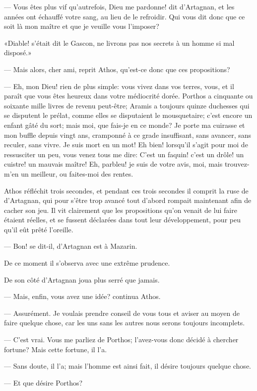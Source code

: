 — Vous êtes plus vif qu'autrefois, Dieu me pardonne! dit d'Artagnan, et les années ont échauffé votre sang, au lieu de le refroidir. Qui vous dit donc que ce soit là mon maître et que je veuille vous l'imposer?

«Diable! s'était dit le Gascon, ne livrons pas nos secrets à un homme si mal disposé.»

— Mais alors, cher ami, reprit Athos, qu'est-ce donc que ces propositions?

— Eh, mon Dieu! rien de plus simple: vous vivez dans vos terres, vous, et il paraît que vous êtes heureux dans votre médiocrité dorée. Porthos a cinquante ou soixante mille livres de revenu peut-être; Aramis a toujours quinze duchesses qui se disputent le prélat, comme elles se disputaient le mousquetaire; c'est encore un enfant gâté du sort; mais moi, que fais-je en ce monde? Je porte ma cuirasse et mon buffle depuis vingt ans, cramponné à ce grade insuffisant, sans avancer, sans reculer, sans vivre. Je suis mort en un mot! Eh bien! lorsqu'il s'agit pour moi de ressusciter un peu, vous venez tous me dire: C'est un faquin! c'est un drôle! un cuistre! un mauvais maître! Eh, parbleu! je suis de votre avis, moi, mais trouvez-m'en un meilleur, ou faites-moi des rentes.

Athos réfléchit trois secondes, et pendant ces trois secondes il comprit la ruse de d'Artagnan, qui pour s'être trop avancé tout d'abord rompait maintenant afin de cacher son jeu. Il vit clairement que les propositions qu'on venait de lui faire étaient réelles, et se fussent déclarées dans tout leur développement, pour peu qu'il eût prêté l'oreille.

— Bon! se dit-il, d'Artagnan est à Mazarin.

De ce moment il s'observa avec une extrême prudence.

De son côté d'Artagnan joua plus serré que jamais.

— Mais, enfin, vous avez une idée? continua Athos.

— Assurément. Je voulais prendre conseil de vous tous et aviser au moyen de faire quelque chose, car les uns sans les autres nous serons toujours incomplets.

— C'est vrai. Vous me parliez de Porthos; l'avez-vous donc décidé à chercher fortune? Mais cette fortune, il l'a.

— Sans doute, il l'a; mais l'homme est ainsi fait, il désire toujours quelque chose.

— Et que désire Porthos?

